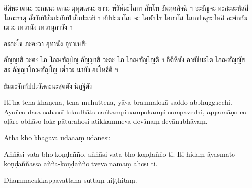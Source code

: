 \documentclass[
  babelLanguage=thai,
  final,
]{chantingbook}
\begin{document}
\clearpage

\thaiText
\markboth{\thaiTitle}{\rightmark}

อิติหะ เตนะ ขะเณนะ เตนะ มุหุตเตนะ ยาวะ พ๎รัห๎มะโลกา สัทโท อัพภุคคัจฉิ ฯ 
อะยัญจะ ทะสะสะหัสสี โลกะธาตุ สังกัมปิสัมปะกัมปิ สัมปะเวธิ ฯ
อัปปะมาโณ จะ โอฬาโร โอภาโส โลเกปาตุระโหสิ อะติกกัมเมวะ เทวานัง เทวานุภาวัง ฯ

อะถะโข ภะคะวา อุทานัง อุทาเนสิ:

อัญญาสิ วะตะ โภ โกณฑัญโญ อัญญาสิ วะตะ โภ โกณฑัญโญติ ฯ
อิติหิทัง อายัส๎มะโต โกณฑัญญัสสะ อัญญาโกณฑัญโญ เต๎ววะ นามัง อะโหสีติ ฯ

ธัมมะจักกัปปะวัตตะนะสุตตัง นิฏฐิตัง

\clearpage

\paliText
\markboth{\paliTitle}{\rightmark}

Iti'ha tena khaṇena, tena muhuttena, yāva brahmalokā saddo abbhuggacchi.
Ayañca dasa-sahassī lokadhātu saṅkampi sampakampi sampavedhi, appamāṇo ca
oḷāro obhāso loke pāturahosi atikkammeva devānaṃ devānubhāvaṃ.

Atha kho bhagavā udānaṃ udānesi:

Aññāsi vata bho koṇḍañño, aññāsi vata bho koṇḍañño ti. Iti hidaṃ āyasmato
koṇḍaññassa aññā-koṇḍañño tveva nāmaṃ ahosī ti.

Dhammacakkappavattana-suttaṃ niṭṭhitaṃ.
\end{document}
